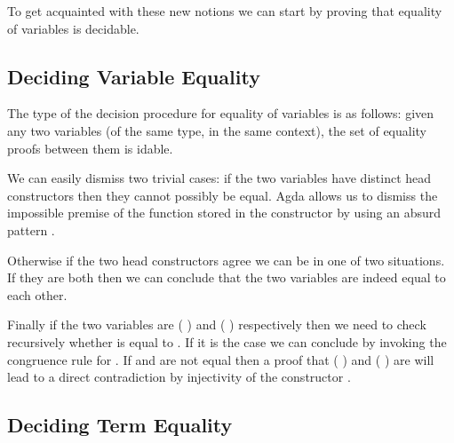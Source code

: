 To get acquainted with these new notions we can start by proving that equality
of variables is decidable.

\subsection{Deciding Variable Equality}

The type of the decision procedure for equality of variables is as follows:
given any two variables (of the same type, in the same context), the set of
equality proofs between them is idable.

\begin{agdasnippet}
\end{agdasnippet}

We can easily dismiss two trivial cases: if the two variables have distinct
head constructors then they cannot possibly be equal. Agda allows us to
dismiss the impossible premise of the function stored in the 
constructor by using an absurd pattern \AS{()}.

\begin{agdasnippet}
\end{agdasnippet}

Otherwise if the two head constructors agree we can be in one of two
situations. If they are both  then we can conclude that the two
variables are indeed equal to each other.

\begin{agdasnippet}
\end{agdasnippet}

Finally if the two variables are {( )} and {( )}
respectively then we need to check recursively whether  is equal
to . If it is the case we can conclude by invoking the congruence
rule for . If  and  are not equal then a proof that
{( )} and {( )} are will lead to a direct
contradiction by injectivity of the constructor .

\begin{agdasnippet}
\end{agdasnippet}

\subsection{Deciding Term Equality}

